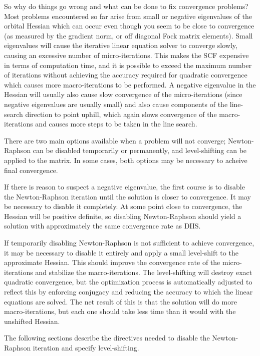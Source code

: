 So why do things go wrong and what can be done to fix convergence
problems?  Most problems encountered so far arise from small or
negative eigenvalues of the orbital Hessian which can occur even
though you seem to be close to convergence (as measured by the
gradient norm, or off diagonal Fock matrix elements).  Small
eigenvalues will cause the iterative linear equation solver to
converge slowly, causing an excessive number of micro-iterations.
This makes the SCF expensive in terms of computation time, and it is
possible to exceed the maximum number of iterations without achieving
the accuracy required for quadratic convergence which causes more
macro-iterations to be performed.  A negative eigenvalue in the
Hessian will usually also cause slow convergence of the
micro-iterations (since negative eigenvalues are usually small) and
also cause components of the line-search direction to point uphill,
which again slows convergence of the macro-iterations and causes more
steps to be taken in the line search.

There are two main options available when a problem will not converge;
Newton-Raphson can be disabled temporarily or permanently, and
level-shifting can be applied to the matrix.  In some cases, both
options may be necessary to acheive final convergence.

If there is reason to suspect a negative eigenvalue, the first course
is to disable the Newton-Raphson iteration until the solution is
closer to convergence.  It may be necessary to disable it completely.
At some point close to convergence, the Hessian will be positive
definite, so disabling Newton-Raphson should yield a solution with
approximately the same convergence rate as DIIS.

If temporarily disabling Newton-Raphson is not sufficient to achieve
convergence, it may be necessary to disable it entirely and apply a
small level-shift to the approximate Hessian.  This should improve the
convergence rate of the micro-iterations and stabilize the
macro-iterations.  The level-shifting will destroy exact quadratic
convergence, but the optimization process is automatically adjusted to
reflect this by enforcing conjugacy and reducing the accuracy to which
the linear equations are solved.  The net result of this is that the
solution will do more macro-iterations, but each one should take less
time than it would with the unshifted Hessian.

The following sections describe the directives needed to disable the
Newton-Raphson iteration and specify level-shifting.


